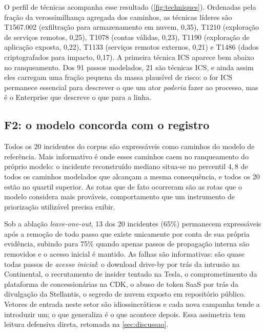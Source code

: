 


O perfil de técnicas acompanha esse resultado (\cref{fig:techniques}).
Ordenadas pela fração da verossimilhança agregada dos caminhos, as técnicas
líderes são T1567.002 (exfiltração para armazenamento em nuvem, 0,35), T1210
(exploração de serviços remotos, 0,25), T1078 (contas válidas, 0,23), T1190
(exploração de aplicação exposta, 0,22), T1133 (serviços remotos externos,
0,21) e T1486 (dados criptografados para impacto, 0,17). A primeira técnica ICS
aparece bem abaixo no ranqueamento. Dos 91 passos modelados, 21 são técnicas
ICS, e ainda assim eles carregam uma fração pequena da massa plausível de
risco: o \attck{} for ICS permanece essencial para descrever o que um ator
\emph{poderia} fazer ao processo, mas é o \attck{} Enterprise que descreve o
que para a linha.



\subsection{F2: o modelo concorda com o registro}

Todos os 20 incidentes do corpus são expressáveis como caminhos do modelo de
referência. Mais informativo é onde esses caminhos caem no ranqueamento do
próprio modelo: o incidente reconstruído mediano situa-se no percentil $4{,}8$
de todos os caminhos modelados que alcançam a mesma consequência, e todos os 20
estão no quartil superior. As rotas que de fato ocorreram são as rotas que o modelo considera mais prováveis, comportamento que um
instrumento de priorização utilizável precisa exibir.

Sob a ablação \emph{leave-one-out}, 13 dos 20 incidentes (65\%) permanecem
expressáveis após a remoção de todo passo que existe unicamente por conta de
sua própria evidência, subindo para 75\% quando apenas passos de propagação
interna são removidos e o acesso inicial é mantido. As falhas são informativas:
são quase todas passos de \emph{acesso inicial}: o download drive-by por
trás da intrusão na Continental, o recrutamento de insider tentado na Tesla, o
comprometimento da plataforma de concessionárias na CDK, o abuso de token SaaS
por trás da divulgação da Stellantis, o segredo de nuvem exposto em repositório
público. Vetores de entrada neste setor são idiossincráticos e cada nova
campanha tende a introduzir um; o que generaliza é o que acontece depois. Essa
assimetria tem leitura defensiva direta, retomada na \cref{sec:discussao}.

